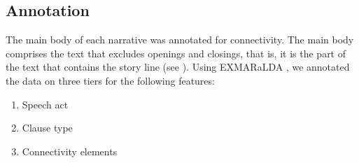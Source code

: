 \documentclass[output=paper,colorlinks,citecolor=brown]{langscibook}
\begin{document}
\subsection{Annotation} \label{sec:schroederetal:2.3}

The main body of each narrative was annotated for connectivity. The main body comprises the text that excludes openings and closings, that is, it is the part of the text that contains the story line (see \cite{chapters/15}). 
Using EXMARaLDA \parencite{schmidt2014exmarlda}, we annotated the data on three tiers for the following features:

\begin{enumerate}[label=\Roman*.]
\item Speech act
\item Clause type
\item Connectivity elements
\end{enumerate}
\end{document}
